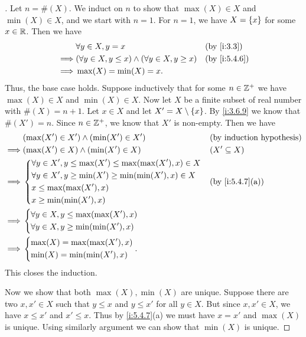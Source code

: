 \begin{proof}[]
  Let \(n = \#(X)\).
  We induct on \(n\) to show that \(\max(X) \in X\) and \(\min(X) \in X\), and we start with \(n = 1\).
  For \(n = 1\), we have \(X = \left\lbrace x\right\rbrace\) for some \(x \in \mathbb{R}\).
  Then we have
  \begin{align*}
             & \forall y \in X, y = x                                        &  & \by{i:3.3}   \\
    \implies & (\forall y \in X, y \leq x) \land (\forall y \in X, y \geq x) &  & \by{i:5.4.6} \\
    \implies & \max(X) = \min(X) = x.
  \end{align*}
  Thus, the base case holds.
  Suppose inductively that for some \(n \in \mathbb{Z}^+\) we have \(\max(X) \in X\) and \(\min(X) \in X\).
  Now let \(X\) be a finite subset of real number with \(\#(X) = n + 1\).
  Let \(x \in X\) and let \(X' = X \setminus \left\lbrace x\right\rbrace\).
  By \cref{i:3.6.9} we know that \(\#(X') = n\).
  Since \(n \in \mathbb{Z}^+\), we know that \(X'\) is non-empty.
  Then we have
  \begin{align*}
             & (\max(X') \in X') \land (\min(X') \in X')                         &  & \byIH            \\
    \implies & (\max(X') \in X) \land (\min(X') \in X)                           &  & (X' \subseteq X) \\
    \implies & \begin{dcases}
                 \forall y \in X', y \leq \max(X') \leq \max(\max(X'), x) \in X \\
                 \forall y \in X', y \geq \min(X') \geq \min(\min(X'), x) \in X \\
                 x \leq \max(\max(X'), x)                                       \\
                 x \geq \min(\min(X'), x)
               \end{dcases} &  & \by{i:5.4.7}[a]                          \\
    \implies & \begin{dcases}
                 \forall y \in X, y \leq \max(\max(X'), x) \\
                 \forall y \in X, y \geq \min(\min(X'), x)
               \end{dcases}                                               \\
    \implies & \begin{dcases}
                 \max(X) = \max(\max(X'), x) \\
                 \min(X) = \min(\min(X'), x)
               \end{dcases}.
  \end{align*}
  This closes the induction.

  Now we show that both \(\max(X), \min(X)\) are unique.
  Suppose there are two \(x, x' \in X\) such that \(y \leq x\) and \(y \leq x'\) for all \(y \in X\).
  But since \(x, x' \in X\), we have \(x \leq x'\) and \(x' \leq x\).
  Thus by \cref{i:5.4.7}(a) we must have \(x = x'\) and \(\max(X)\) is unique.
  Using similarly argument we can show that \(\min(X)\) is unique.
\end{proof}

